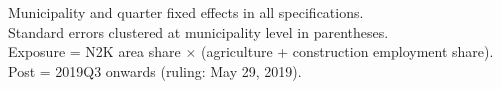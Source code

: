 \begin{table}[htbp]
   \par \raggedright 
   Municipality and quarter fixed effects in all specifications.\\
   Standard errors clustered at municipality level in parentheses.\\
   Exposure = N2K area share $\times$ (agriculture + construction employment share).\\
   Post = 2019Q3 onwards (ruling: May 29, 2019).
\end{table}
